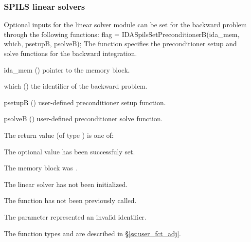 \subsubsection{SPILS linear solvers}
Optional inputs for the {\idaspils} linear solver module can be set for the backward
problem through the following functions:
{
  flag = IDASpilsSetPreconditionerB(ida\_mem, which, psetupB, psolveB);
}
{
  The function  specifies the preconditioner
  setup and solve functions for the backward integration.
}
{
  \begin{args}[psetupB]
  \item[ida\_mem] ()
    pointer to the {\idas} memory block.
  \item[which] ()
    the identifier of the backward problem.
  \item[psetupB] ()
    user-defined preconditioner setup function.
  \item[psolveB] ()
    user-defined preconditioner solve function.
  \end{args}
}
{
  The return value  (of type ) is one of:
  \begin{args}
  \item[\Id{IDASPILS\_SUCCESS}] 
    The optional value has been successfuly set.
  \item[\Id{IDASPILS\_MEM\_NULL}]
    The  memory block was .
  \item[\Id{IDASPILS\_LMEM\_NULL}]
    The {\idaspgmr} linear solver has not been initialized.
  \item[\Id{IDASPILS\_NO\_ADJ}]
    The function  has not been previously called.
  \item[\Id{IDASPILS\_ILL\_INPUT}]
    The parameter  represented an invalid identifier.
  \end{args}
}
{
   The function types  and  are
   described in \S\ref{ss:user_fct_adj}.
}
